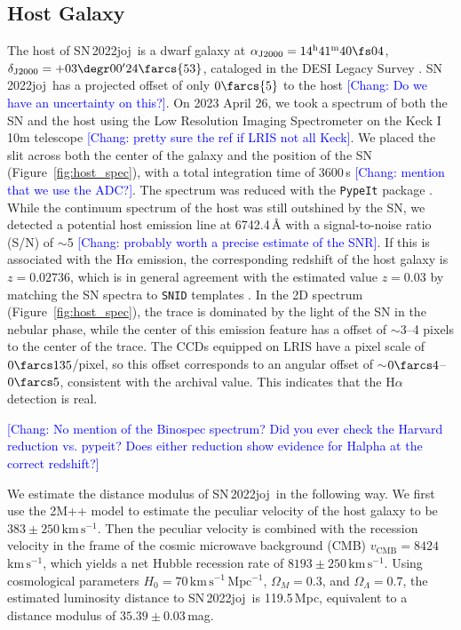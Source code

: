 \documentclass[twocolumn]{aastex631}
\newcommand{\sn}{SN\,2022joj}
\newcommand{\kms}{$\mathrm{km}\,\mathrm{s}^{-1}$}
\newcommand{\chang}[1]{\textcolor{blue}{[Chang: #1]}}
\begin{document}
\begin{CJK*}{UTF8}{gbsn}
\subsection{Host Galaxy}
The host of \sn\ is a dwarf galaxy at $\alpha_\mathrm{J2000}=14^\mathrm{h}41^\mathrm{m}40\fs04$, $\delta_\mathrm{J2000}=+03\degr00'24\farcs{53}$, cataloged in the DESI Legacy Survey \citep[LS;][]{Dey_LS_2019}. \sn\ has a projected offset of only $0\farcs{5}$ to the host \chang{Do we have an uncertainty on this?}. On 2023 April 26, we took a spectrum of both the SN and the host using the Low Resolution Imaging Spectrometer \citep[LRIS;][]{Keck_1995} on the Keck I 10m telescope \chang{pretty sure the ref if LRIS not all Keck}. We placed the slit across both the center of the galaxy and the position of the SN (Figure~\ref{fig:host_spec}), with a total integration time of 3600\,s \chang{mention that we use the ADC?}. The spectrum was reduced with the \texttt{PypeIt} package \citep{pypeit:joss_pub}. While the continuum spectrum of the host was still outshined by the SN, we detected a potential host emission line at 6742.4\,\r{A} with a signal-to-noise ratio (S/N) of $\sim$5 \chang{probably worth a precise estimate of the SNR}. If this is associated with the H$\alpha$ emission, the corresponding redshift of the host galaxy is $z=0.02736$, which is in general agreement with the estimated value $z=0.03$ by matching the SN spectra to \texttt{SNID} templates \citep{Newsome_2022TNSCR}. In the 2D spectrum (Figure~\ref{fig:host_spec}), the trace is dominated by the light of the SN in the nebular phase, while the center of this emission feature has a offset of $\sim$3--4 pixels to the center of the trace. The CCDs equipped on LRIS have a pixel scale of $0\farcs135$/pixel, so this offset corresponds to an angular offset of $\sim$$0\farcs4$--$0\farcs5$, consistent with the archival value. This indicates that the H$\alpha$ detection is real.

\chang{No mention of the Binospec spectrum? Did you ever check the Harvard reduction vs. pypeit? Does either reduction show evidence for Halpha at the correct redshift?}

We estimate the distance modulus of \sn\ in the following way. We first use the 2M++ model \citep{Carrick2015_2M++} to estimate the peculiar velocity of the host galaxy to be $383\pm250$\,\kms. Then the peculiar velocity is combined with the recession velocity in the frame of the cosmic microwave background (CMB) $v_\mathrm{CMB}=8424$\,\kms, which yields a net Hubble recession rate of $8193\pm250$\,\kms. Using cosmological parameters $H_0 = 70\,\mathrm{km\,s^{-1}\,Mpc^{-1}}$, $\Omega_M=0.3$, and $\Omega_\Lambda=0.7$, the estimated luminosity distance to \sn\ is 119.5\,Mpc, equivalent to a distance modulus of $35.39\pm0.03$\,mag.


\end{CJK*}
\end{document}
